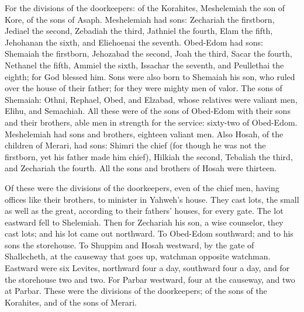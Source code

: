  For the divisions of the doorkeepers: of the Korahites,
Meshelemiah the son of Kore, of the sons of Asaph. 
Meshelemiah had sons: Zechariah the firstborn, Jediael the second,
Zebadiah the third, Jathniel the fourth,  Elam the fifth,
Jehohanan the sixth, and Eliehoenai the seventh. 
Obed-Edom had sons: Shemaiah the firstborn, Jehozabad the second, Joah
the third, Sacar the fourth, Nethanel the fifth,  Ammiel
the sixth, Issachar the seventh, and Peullethai the eighth; for God
blessed him.  Sons were also born to Shemaiah his son, who
ruled over the house of their father; for they were mighty men of valor.
 The sons of Shemaiah: Othni, Rephael, Obed, and Elzabad,
whose relatives were valiant men, Elihu, and Semachiah. 
All these were of the sons of Obed-Edom with their sons and their
brothers, able men in strength for the service: sixty-two of Obed-Edom.
 Meshelemiah had sons and brothers, eighteen valiant men.
 Also Hosah, of the children of Merari, had sons: Shimri
the chief (for though he was not the firstborn, yet his father made him
chief),  Hilkiah the second, Tebaliah the third, and
Zechariah the fourth. All the sons and brothers of Hosah were thirteen.

 Of these were the divisions of the doorkeepers, even of
the chief men, having offices like their brothers, to minister in
Yahweh's house.  They cast lots, the small as well as the
great, according to their fathers' houses, for every gate.
 The lot eastward fell to Shelemiah. Then for Zechariah
his son, a wise counselor, they cast lots; and his lot came out
northward.  To Obed-Edom southward; and to his sons the
storehouse.  To Shuppim and Hosah westward, by the gate
of Shallecheth, at the causeway that goes up, watchman opposite
watchman.  Eastward were six Levites, northward four a
day, southward four a day, and for the storehouse two and two.
 For Parbar westward, four at the causeway, and two at
Parbar.  These were the divisions of the doorkeepers; of
the sons of the Korahites, and of the sons of Merari.

